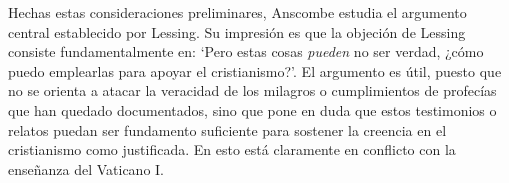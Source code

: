 

Hechas estas consideraciones preliminares, Anscombe estudia el argumento central establecido por Lessing. Su impresión es que la objeción de Lessing consiste fundamentalmente en: \enquote*{Pero estas cosas \emph{pueden} no ser verdad, ¿cómo puedo emplearlas para apoyar el cristianismo?}. El argumento es útil, puesto que no se orienta a atacar la veracidad de los milagros o cumplimientos de profecías que han quedado documentados, sino que pone en duda que estos testimonios o relatos puedan ser fundamento suficiente para sostener la creencia en el cristianismo como justificada. En esto está claramente en conflicto con la enseñanza del Vaticano I.

